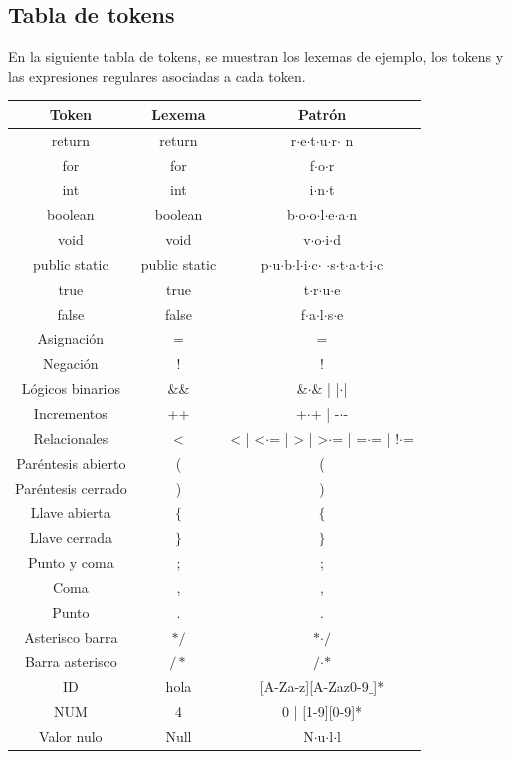 \documentclass[12pt,a4paper]{article}
\begin{document}
\subsection{Tabla de tokens}
En la siguiente tabla de tokens, se muestran los lexemas de ejemplo, los tokens y las expresiones regulares asociadas a cada token.
\begin{center}
		\begin{tabular}{|c|c|c|}
			\hline 
			\textbf{Token} & \textbf{Lexema} & \textbf{Patrón} \\ 
			\hline 
			return & return & r$\cdot$e$\cdot$t$\cdot$u$\cdot$r$\cdot$ n  \\ 
			\hline 
			for & for & f$\cdot$o$\cdot$r \\ 
			\hline 
			int & int & i$\cdot$n$\cdot$t \\ 
			\hline 
			boolean	& boolean & b$\cdot$o$\cdot$o$\cdot$l$\cdot$e$\cdot$a$\cdot$n \\ 
			\hline 
			void	& void & v$\cdot$o$\cdot$i$\cdot$d \\ 
			\hline 
			public static	& public static & p$\cdot$u$\cdot$b$\cdot$l$\cdot$i$\cdot$c$\cdot$ $\cdot$s$\cdot$t$\cdot$a$\cdot$t$\cdot$i$\cdot$c \\ 
			\hline 
			true	& true & t$\cdot$r$\cdot$u$\cdot$e \\ 
			\hline 
				false	& false & f$\cdot$a$\cdot$l$\cdot$s$\cdot$e \\ 
			\hline 
			Asignación	& = & = \\ 
			\hline
			Negación	& ! & ! \\ 
			\hline
			Lógicos binarios	& \&\& &  \&$\cdot$\& | |$\cdot$| \\ 
			\hline
			Incrementos	& ++ &  +$\cdot$+ | -$\cdot$- \\ 
			\hline
			Relacionales	& < &  < | <$\cdot$= | > | >$\cdot$= | =$\cdot$= | !$\cdot$= \\ 
			\hline
			Paréntesis abierto	& ( & ( \\ 
			\hline 
			Paréntesis cerrado	& ) & ) \\ 
			\hline 
			Llave abierta	& $\{$ & $\{$ \\ 
			\hline 
			Llave cerrada	& $\}$ & $\}$ \\ 
			\hline 
			Punto y coma	& ; & ; \\ 
			\hline 
			Coma	& , &  , \\ 
			\hline
			Punto	& . &  . \\ 
			\hline
			Asterisco barra & $\ast/$  & $\ast$$\cdot/$ \\ 
			\hline 
			Barra asterisco & $/\ast$  &  $/$$\cdot$$\ast$ \\ 
			\hline  
			ID	& hola  & [A-Za-z][A-Zaz0-9$\_$]* \\ 
			\hline 
				NUM	& 4  & 0 | [1-9][0-9]* \\ 
			\hline
				Valor nulo	& Null  & N$\cdot$u$\cdot$l$\cdot$l \\ 
			\hline  
			
		
		\end{tabular} 	
	\end{center}
\end{document}
